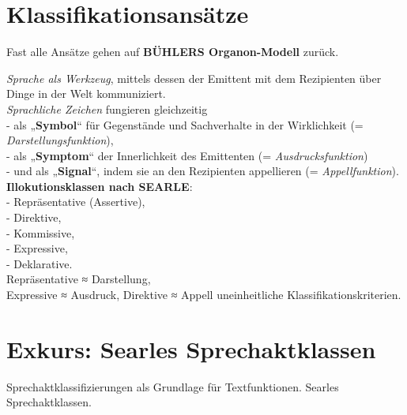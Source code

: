 \documentclass[
  letterpaper,
]{scrbook}
\begin{document}
\hypertarget{klassifikationsansuxe4tze}{%
\section{Klassifikationsansätze}\label{klassifikationsansuxe4tze}}

Fast alle Ansätze gehen auf \textbf{BÜHLERS Organon-Modell} zurück.

\emph{Sprache als Werkzeug}, mittels dessen der Emittent mit dem
Rezipienten über Dinge in der Welt kommuniziert.\\

\emph{Sprachliche Zeichen} fungieren gleichzeitig\\
- als „\textbf{Symbol}`` für Gegenstände und Sachverhalte in der
Wirklichkeit (= \emph{Darstellungsfunktion}),\\
- als „\textbf{Symptom}`` der Innerlichkeit des Emittenten (=
\emph{Ausdrucksfunktion})\\
- und als „\textbf{Signal}``, indem sie an den Rezipienten appellieren
(= \emph{Appellfunktion}).\\

\textbf{Illokutionsklassen nach SEARLE}:\\
- Repräsentative (Assertive),\\
- Direktive,\\
- Kommissive,\\
- Expressive,\\
- Deklarative.\\

Repräsentative ≈ Darstellung,\\
Expressive ≈ Ausdruck, Direktive ≈ Appell uneinheitliche
Klassifikationskriterien.\\

\hypertarget{exkurs-searles-sprechaktklassen}{%
\section{Exkurs: Searles
Sprechaktklassen}\label{exkurs-searles-sprechaktklassen}}

Sprechaktklassifizierungen als Grundlage für Textfunktionen. Searles
Sprechaktklassen.
\end{document}
